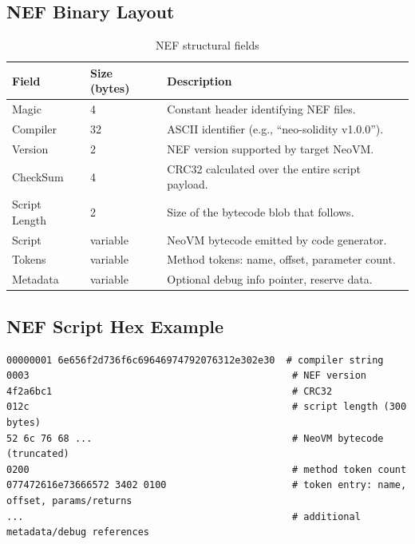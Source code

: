 \documentclass[11pt]{article}
\begin{document}
\subsection{NEF Binary Layout}
\begin{table}[H]
\centering
\caption{NEF structural fields}
\begin{tabularx}{\textwidth}{@{}p{}p{}X@{}}
\toprule
Field & Size (bytes) & Description \\
\midrule
Magic & 4 & Constant header identifying NEF files.\\
Compiler & 32 & ASCII identifier (e.g., ``neo-solidity v1.0.0'').\\
Version & 2 & NEF version supported by target NeoVM.\\
CheckSum & 4 & CRC32 calculated over the entire script payload.\\
Script Length & 2 & Size of the bytecode blob that follows.\\
Script & variable & NeoVM bytecode emitted by code generator.\\
Tokens & variable & Method tokens: name, offset, parameter count.\\
Metadata & variable & Optional debug info pointer, reserve data.\\
\bottomrule
\end{tabularx}
\end{table}

\subsection{NEF Script Hex Example}
\begin{small}
\begin{verbatim}
00000001 6e656f2d736f6c69646974792076312e302e30  # compiler string
0003                                              # NEF version
4f2a6bc1                                          # CRC32
012c                                              # script length (300 bytes)
52 6c 76 68 ...                                   # NeoVM bytecode (truncated)
0200                                              # method token count
077472616e73666572 3402 0100                      # token entry: name, offset, params/returns
...                                               # additional metadata/debug references
\end{verbatim}
\end{small}
\end{document}
